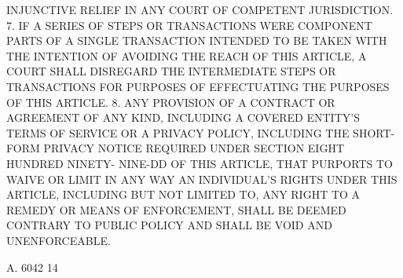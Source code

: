  INJUNCTIVE RELIEF IN ANY COURT OF COMPETENT JURISDICTION.
   7. IF A SERIES OF STEPS OR TRANSACTIONS  WERE  COMPONENT  PARTS  OF  A
 SINGLE  TRANSACTION  INTENDED TO BE TAKEN WITH THE INTENTION OF AVOIDING
 THE REACH OF THIS ARTICLE, A  COURT  SHALL  DISREGARD  THE  INTERMEDIATE
 STEPS  OR TRANSACTIONS FOR PURPOSES OF EFFECTUATING THE PURPOSES OF THIS
 ARTICLE.
   8. ANY PROVISION OF A CONTRACT OR AGREEMENT OF ANY KIND,  INCLUDING  A
 COVERED  ENTITY'S  TERMS  OF  SERVICE OR A PRIVACY POLICY, INCLUDING THE
 SHORT-FORM PRIVACY NOTICE REQUIRED UNDER SECTION EIGHT  HUNDRED  NINETY-
 NINE-DD  OF  THIS ARTICLE, THAT PURPORTS TO WAIVE OR LIMIT IN ANY WAY AN
 INDIVIDUAL'S RIGHTS UNDER THIS ARTICLE, INCLUDING BUT  NOT  LIMITED  TO,
 ANY  RIGHT TO A REMEDY OR MEANS OF ENFORCEMENT, SHALL BE DEEMED CONTRARY
 TO PUBLIC POLICY AND SHALL BE VOID AND UNENFORCEABLE.

 A. 6042                            14
 
